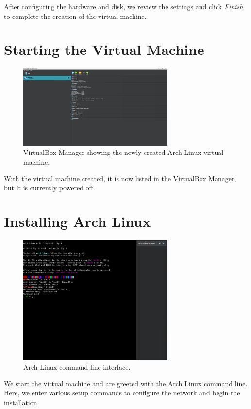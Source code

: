 \documentclass{article}
\begin{document}
After configuring the hardware and disk, we review the settings and click \textit{Finish} to complete the creation of the virtual machine.

\section{Starting the Virtual Machine}
\begin{figure}[H]
    \centering
    \includegraphics[width=0.7\textwidth]{7.png}
    \caption{VirtualBox Manager showing the newly created Arch Linux virtual machine.}
\end{figure}

With the virtual machine created, it is now listed in the VirtualBox Manager, but it is currently powered off.

\section{Installing Arch Linux}
\begin{figure}[H]
    \centering
    \includegraphics[width=0.7\textwidth]{8.png}
    \caption{Arch Linux command line interface.}
\end{figure}

We start the virtual machine and are greeted with the Arch Linux command line. Here, we enter various setup commands to configure the network and begin the installation.
\end{document}
